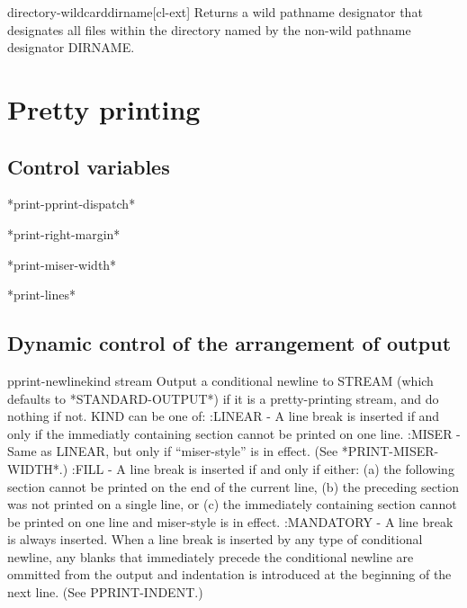 \documentclass[10pt,english]{book}
\begin{document}
\begin{function}{directory-wildcard}{dirname}[cl-ext]
  Returns a wild pathname designator that designates all files within
  the directory named by the non-wild pathname designator DIRNAME.
\end{function}


\chapter{Pretty printing}
\label{cha:pretty-printing}

\section{Control variables}
\label{sec:control-variables}

\begin{variable}{*print-pprint-dispatch*}{}
  
\end{variable}

\begin{variable}{*print-right-margin*}{}
  
\end{variable}

\begin{variable}{*print-miser-width*}{}
  
\end{variable}

\begin{variable}{*print-lines*}{}
  
\end{variable}

\section{Dynamic control of the arrangement of output}
\label{sec:dynam-contr-arrang}

\begin{function}{pprint-newline}{kind \op stream}
  Output a conditional newline to STREAM (which defaults to
   *STANDARD-OUTPUT*) if it is a pretty-printing stream, and do
   nothing if not. KIND can be one of:
     :LINEAR - A line break is inserted if and only if the immediatly
        containing section cannot be printed on one line.
     :MISER - Same as LINEAR, but only if ``miser-style'' is in effect.
        (See *PRINT-MISER-WIDTH*.)
     :FILL - A line break is inserted if and only if either:
       (a) the following section cannot be printed on the end of the
           current line,
       (b) the preceding section was not printed on a single line, or
       (c) the immediately containing section cannot be printed on one
           line and miser-style is in effect.
     :MANDATORY - A line break is always inserted.
   When a line break is inserted by any type of conditional newline, any
   blanks that immediately precede the conditional newline are ommitted
   from the output and indentation is introduced at the beginning of the
   next line. (See PPRINT-INDENT.)
\end{function}
\end{document}
